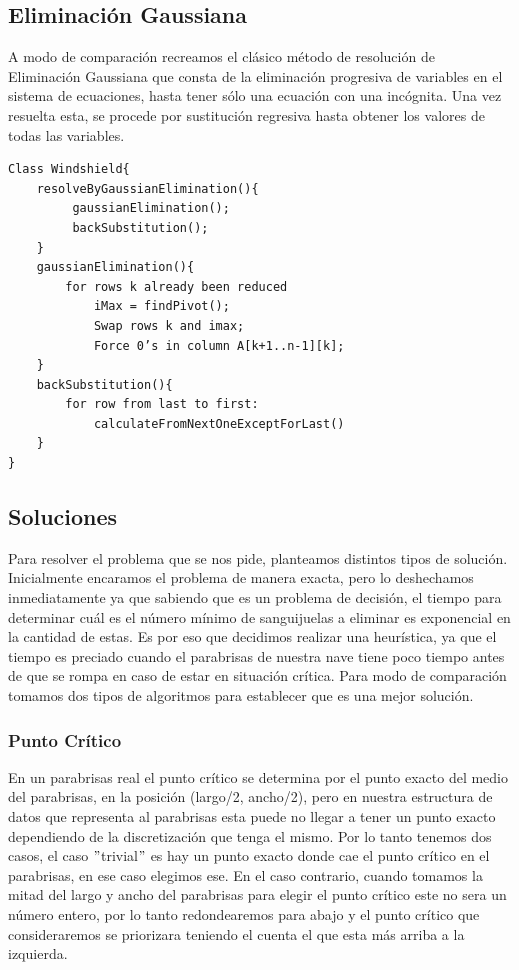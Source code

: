 \newpage

\subsection{Eliminación Gaussiana}
 A modo de comparación recreamos el clásico método de resolución de Eliminación Gaussiana que consta de la eliminación progresiva de variables en el sistema de ecuaciones, hasta tener sólo una ecuación con una incógnita. Una vez resuelta esta, se procede por sustitución regresiva hasta obtener los valores de todas las variables.

\begin{verbatim}
Class Windshield{
    resolveByGaussianElimination(){
         gaussianElimination();
         backSubstitution();
    } 
    gaussianElimination(){
        for rows k already been reduced
            iMax = findPivot();
            Swap rows k and imax;
            Force 0’s in column A[k+1..n-1][k];
    }
    backSubstitution(){
        for row from last to first:
            calculateFromNextOneExceptForLast()
    }
}
\end{verbatim}



\subsection{Soluciones}

Para resolver el problema que se nos pide, planteamos distintos tipos de solución. Inicialmente encaramos el problema de manera exacta, pero lo deshechamos inmediatamente ya que sabiendo que es un problema de decisión, el tiempo para determinar cuál es el número mínimo de sanguijuelas a eliminar es exponencial en la cantidad de estas. Es por eso que decidimos realizar una heurística, ya que el tiempo es preciado cuando el parabrisas de nuestra nave tiene poco tiempo antes de que se rompa en caso de estar en situación crítica. Para modo de comparación tomamos dos tipos de algoritmos para establecer que es una mejor solución.

\subsubsection{Punto Crítico}
En un parabrisas real el punto crítico se determina por el punto exacto del medio del parabrisas, en la posición (largo/2, ancho/2), pero en nuestra estructura de datos que representa al parabrisas esta puede no llegar a tener un punto exacto dependiendo de la discretización que tenga el mismo. Por lo tanto tenemos dos casos, el caso $"$trivial$"$ es hay un punto exacto donde cae el punto crítico en el parabrisas, en ese caso elegimos ese. En el caso contrario, cuando tomamos la mitad del largo y ancho del parabrisas para elegir el punto crítico este no sera un número entero, por lo tanto redondearemos para abajo y el punto crítico que consideraremos se priorizara teniendo el cuenta el que esta más arriba a la izquierda.

